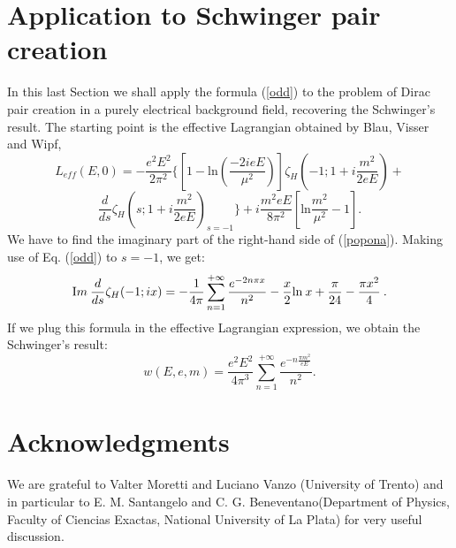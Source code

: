 \documentclass [11pt]{article}
\begin{document}
\section{Application to Schwinger pair creation}

In this last Section we shall apply the formula (\ref{odd}) to the problem of 
Dirac pair creation in a purely electrical background field,
recovering the Schwinger's result.
The starting point is  the effective Lagrangian obtained by Blau, Visser and Wipf,
\begin{equation}\nonumber
\label{popona} L_{eff}(E,0)=-\frac{e^{2}E^{2}}{2\pi ^{2}}\{[1-\mbox{ln}(\frac{-2ieE}{\mu ^{2}})]\zeta _{H}(-1;1+i\frac{m^{2}}{2eE})+
\end{equation}
\begin{equation}
\frac{d}{ds}\zeta _{H}(s;1+i\frac{m^{2}}{2eE})_{s=-1}\}+i\frac{m^{2}eE}{8\pi ^{2}}[\mbox{ln}\frac{m^{2}}{\mu ^{2}}-1] .
\end{equation}
We have to find the imaginary part of the right-hand side of (\ref{popona}).
Making use of Eq.
(\ref{odd}) to $s=-1$, we get:
\begin{equation}
\mbox Im \: \frac{d}{ds}\zeta_H(-1;ix)= -\frac{1}{4\pi}\sum_{n=1}^{+\infty}\frac{e^{-2n \pi x}}{n^{2}}
-\frac{x}{2}\mbox{ln} \:x
+\frac{\pi}{24}-\frac{\pi x^2}{4}\:.
\end{equation}
If we plug this formula in the effective Lagrangian expression, 
we obtain the Schwinger's result:
\begin{equation}
w(E,e,m)=\frac{e^{2}E^{2}}{4\pi ^{3}}\sum _{n=1}^{+\infty }\frac{e^{-n\frac{\pi m^{2}}{eE}}}{n^{2}}.
\end{equation}

\section{Acknowledgments}
We are grateful to Valter Moretti and Luciano Vanzo (University of Trento) and in  particular to 
E. M. Santangelo and C. G. Beneventano(Department of Physics, Faculty of Ciencias Exactas, National
University of La Plata) for very useful discussion.
\\
\\
\end{document}
